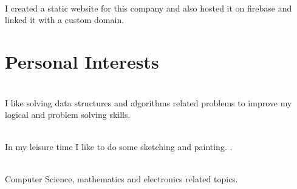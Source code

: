 \documentclass[]{deedy-resume-openfont}
\begin{document}
       
           \hfill {}\\
           I created a static website for this company and also hosted it on firebase and linked it with a custom domain.\\
           \sectionsep

       \section{Personal Interests}
       \raggedright
         
                             \\
            I like solving data structures and algorithms related problems to improve my logical and problem solving skills. 
           \sectionsep
       
       
           \\
            In my leisure time I like to do some sketching and painting. .\\
           \sectionsep
         
       
           \\
            Computer Science, mathematics and electronics related topics.\\
           \sectionsep



     \ 
     
\end{document}
